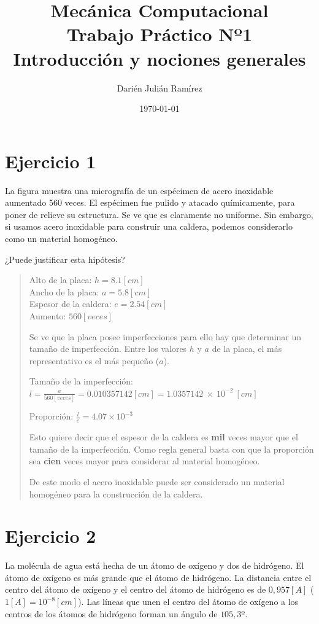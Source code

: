 \documentclass[a4paper,12pt,twoside,final,spanish]{article}
\title{\Huge Mecánica Computacional\\
Trabajo Práctico Nº1\\
Introducción y nociones generales}
\author{Darién Julián Ramírez}
\date{\today}
\begin{document}
\maketitle %

\section{Ejercicio 1}

La figura muestra una micrografía de un espécimen de acero inoxidable aumentado 560 veces. El espécimen fue pulido y atacado químicamente, para poner de relieve su estructura. Se ve que es claramente no uniforme. Sin embargo, si usamos acero inoxidable para construir una caldera, podemos considerarlo como un material homogéneo.

¿Puede justificar esta hipótesis? 

\dotfill

\begin{quote}
Alto de la placa: $h=8.1[cm]$\\
Ancho de la placa: $a=5.8[cm]$\\
Espesor de la caldera: $e=2.54[cm]$\\
Aumento: $560 [veces]$

Se ve que la placa posee imperfecciones para ello hay que determinar un tamaño de imperfección. Entre los valores $h$ y $a$ de la placa, el más representativo es el más pequeño ($a$).

Tamaño de la imperfección: $l=\frac{a}{560 [veces]}=0.010357142 [cm]=1.0357142~\times~10^{-2}~[cm]$

Proporción: $\frac{l}{e}=4.07\times10^{-3}$

Esto quiere decir que el espesor de la caldera es \textbf{mil} veces mayor que el tamaño de la imperfección. Como regla general basta con que la proporción sea \textbf{cien} veces mayor para considerar al material homogéneo.

De este modo el acero inoxidable puede ser considerado un material homogéneo para la construcción de la caldera. 
\end{quote}

\section{Ejercicio 2}

La molécula de agua está hecha de un átomo de oxígeno y dos de hidrógeno. El átomo de oxígeno es más grande que el átomo de hidrógeno. La distancia entre el centro del átomo de oxígeno y el centro del átomo de hidrógeno es de $0,957[A]$ ($1[A]=10^{-8}[cm]$). Las líneas que unen el centro del átomo de oxígeno a los centros de los átomos de hidrógeno forman un ángulo de $105,3º$.
\end{document}
